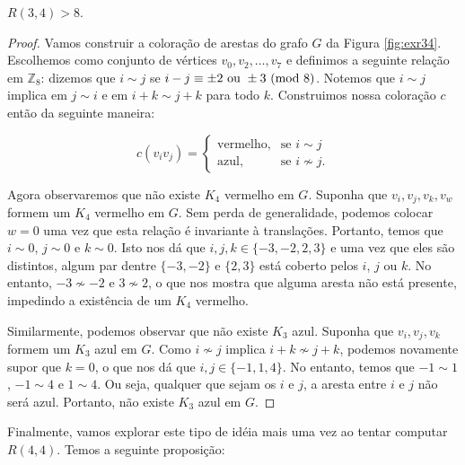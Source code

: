 \begin{proposition}
\label{thm:exr34}
$R(3,4) > 8$.
\end{proposition}
\begin{proof}
Vamos construir a coloração de arestas do grafo $G$ da Figura \ref{fig:exr34}. Escolhemos como conjunto de vértices $v_0, v_2, \dots, v_7$ e definimos a seguinte relação em $\mathbb{Z}_8$: dizemos que $i \sim j$ se $ i - j \equiv \pm 2 \text{ ou } \pm 3 \ (\text{mod}\ 8)$.
Notemos que $i \sim j$ implica em $ j \sim i$ e em $i + k \sim j + k$ para todo $k$. Construimos nossa coloração $c$ então da seguinte maneira:

\[c(v_i v_j) = \begin{cases}
  \text{vermelho}, & \text{se } i \sim j \\
  \text{azul}, & \text{se } i \not\sim j.
\end{cases}\]

Agora observaremos que não existe $K_4$ vermelho em $G$. Suponha que $v_i, v_j, v_k, v_w$ formem um $K_4$ vermelho em $G$. Sem perda de generalidade, podemos colocar $w = 0$ uma vez que esta relação é invariante à translações. Portanto, temos que $i \sim 0$, $j \sim 0$ e $k \sim 0$. Isto nos dá que $i,j,k \in \{-3,-2,2,3\}$ e uma vez que eles são distintos, algum par dentre $\{-3,-2\}$ e $\{2,3\}$ está coberto pelos $i$, $j$ ou $k$.
No entanto, $-3 \not\sim -2$ e $3 \not\sim 2$, o que nos mostra que alguma aresta não está presente, impedindo a existência de um $K_4$ vermelho.

Similarmente, podemos observar que não existe $K_3$ azul. Suponha que $v_i, v_j, v_k$ formem um $K_3$ azul em $G$. Como $i \not\sim j$ implica $i + k \not\sim j + k$, podemos novamente supor que $k = 0$, o que nos dá que $i,j \in \{-1,1,4\}$.
No entanto, temos que $-1 \sim 1$, $-1 \sim 4$ e $1 \sim 4$. Ou seja, qualquer que sejam os $i$ e $j$, a aresta entre $i$ e $j$ não será azul. Portanto, não existe $K_3$ azul em $G$.
\end{proof}

Finalmente, vamos explorar este tipo de idéia mais uma vez ao tentar computar $R(4,4)$. Temos a seguinte proposição:

